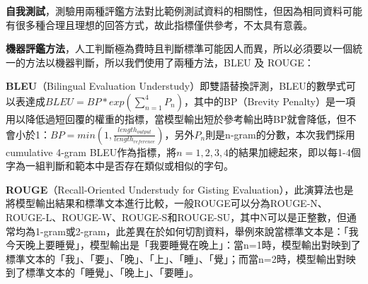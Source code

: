 \documentclass[8pt,a4paper,新細明體,UTF8,natbib]{article}
\begin{document}
\begin{CJK*}{UTF8}{bsmi}
	\textbf{自我測試}，測驗用兩種評鑑方法對比範例測試資料的相關性，但因為相同資料可能有很多種合理且理想的回答方式，故此指標僅供參考，不太具有意義。

	\textbf{機器評鑑方法}，人工判斷極為費時且判斷標準可能因人而異，所以必須要以一個統一的方法以機器判斷，所以我們使用了兩種方法，BLEU 及 ROUGE：

	\hspace*{0.1cm}%
	\begin{minipage}{.9\textwidth}%
		\textbf{BLEU}（Bilingual Evaluation Understudy）即雙語替換評測，BLEU的數學式可以表達成$BLEU=BP*exp(\sum_{n=1}^{4}P_n)$，其中的BP（Brevity Penalty）是一項用以降低過短回覆的權重的指標，當模型輸出短於參考輸出時BP就會降低，但不會小於1：$BP=min(1,\frac{length_{output}}{length_{reference}})$，另外$P_n$則是n-gram的分數，本次我們採用cumulative 4-gram BLEU作為指標，將$n=1,2,3,4$的結果加總起來，即以每1-4個字為一組判斷和範本中是否存在類似或相似的字句。\cite{papineni2002bleu}

		\textbf{ROUGE}（Recall-Oriented Understudy for Gisting Evaluation），此演算法也是將模型輸出結果和標準文本進行比較，一般ROUGE可以分為ROUGE-N、ROUGE-L、ROUGE-W、ROUGE-S和ROUGE-SU\cite{Lin2004LookingFA}，其中N可以是正整數，但通常均為1-gram或2-gram，此差異在於如何切割資料，舉例來說當標準文本是：「我今天晚上要睡覺」，模型輸出是「我要睡覺在晚上」：當n=1時，模型輸出對映到了標準文本的「我」、「要」、「晚」、「上」、「睡」、「覺」；而當n=2時，模型輸出對映到了標準文本的「睡覺」、「晚上」、「要睡」。


\end{minipage}
\end{CJK*}
\end{document}
